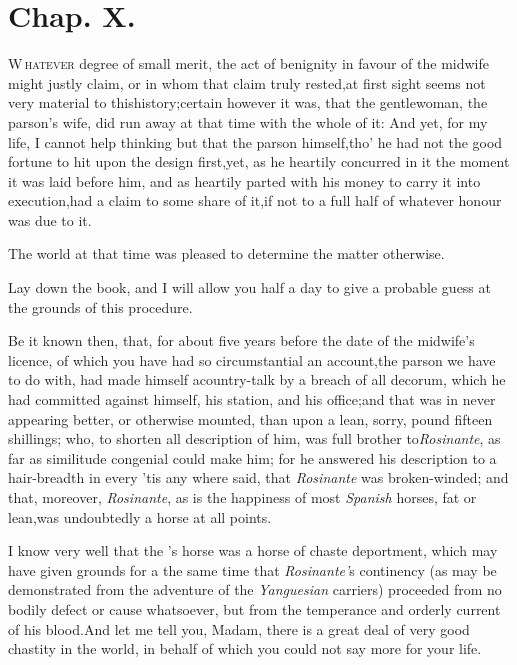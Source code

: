 \documentclass{article}
\begin{document}
\vskip-6pt

\enlargethispage\baselineskip

\section{Chap. X.}

\lettrine{W\,}{hatever} degree of small merit, the
act of benignity in favour of the midwife might justly claim, or in
whom that claim truly rested,\tsk  at first sight seems not very
material to this\break history;\tsh  certain however it was, that
the gentlewoman, the parson’s wife, did run away at that time
with the whole of it: And yet, for my life, I cannot help thinking
but that the parson himself,\pb tho’ he had not the good fortune to
hit upon the design first,\tsk  yet, as he heartily concurred in
it the moment it was laid before him, and as heartily parted with\break
his money to carry it into execution,\break had a claim to some share of
it,\tsk  if not to a full half of whatever honour was due to
it.

The world at that time was pleased to determine the matter
otherwise.

Lay down the book, and I will allow you half a day to give a
probable guess at the grounds of this procedure.

Be it known then, that, for about five years before the date of
the midwife’s licence, of which you have had so
circumstantial an account,\tsk  the parson we have to do with, had
made himself a\pb country-talk by a breach of all decorum, which he
had committed against himself, his station, and his
office;\tsk  and that was in never appearing better, or otherwise
mounted, than upon a lean, sorry,\break
{}
pound fifteen shillings; who, to shorten all description of
him, was full brother to\break \textit{Rosinante}, as far as similitude
congenial could make him; for he answered his description to a
hair-breadth in every\break
{}
’tis any where said, that \textit{Rosinante} was broken-winded;
and that, moreover, \textit{Rosinante}, as is the happiness of most
\textit{Spanish} horses, fat or lean,\tsk  was undoubtedly a horse
at all points.

I know very well that the ’s\break
horse was a horse of chaste deportment, which may
have given grounds for a\pb 
{}
the same time that \textit{Rosinante’}s continen\-cy (as may
be demonstrated from the adventure of the \textit{Yanguesian}
carriers) proceeded from no bodily defect or cause whatsoever, but
from the temperance and orderly current of his blood.\tsk  And\break
let me tell you, Madam, there is a great deal of very good chastity in the world, in
behalf of which you could not say more for your life.
\end{document}
